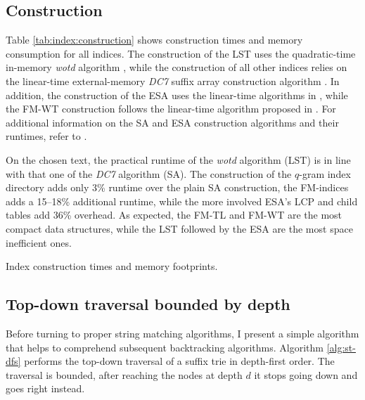 \subsection{Construction}
\label{sec:index:algo:construction}

Table \ref{tab:index:construction} shows construction times and memory consumption for all indices.
The construction of the LST uses the quadratic-time in-memory \emph{wotd} algorithm \citep{Giegerich1999}, while the construction of all other indices relies on the linear-time external-memory \emph{DC7} suffix array construction algorithm \citep{Dementiev2008}.
In addition, the construction of the ESA uses the linear-time algorithms in \citep{Kasai2001,Abouelhoda2004}, while the FM-WT construction follows the linear-time algorithm proposed in \citep{Grossi2003}.
For additional information on the SA and ESA construction algorithms and their runtimes, refer to \citep{Weese2013}.

On the chosen text, the practical runtime of the \emph{wotd} algorithm (LST) is in line with that one of the \emph{DC7} algorithm (SA). The construction of the $q$-gram index directory adds only 3\% runtime over the plain SA construction, the FM-indices adds a 15--18\% additional runtime, while the more involved ESA's LCP and child tables add 36\% overhead.
As expected, the FM-TL and FM-WT are the most compact data structures, while the LST followed by the ESA are the most space inefficient ones.

\begin{table}[t]
\begin{center}
\caption[Index construction times and memory footprints]{Index construction times and memory footprints.}
\sffamily

\label{tab:index:construction}
\end{center}
\end{table}

\subsection{Top-down traversal bounded by depth}
\label{sec:index:algo:traversal}

Before turning to proper string matching algorithms, I present a simple algorithm that helps to comprehend subsequent backtracking algorithms.
Algorithm \ref{alg:st-dfs} performs the top-down traversal of a suffix trie in depth-first order.
The traversal is bounded, \ie after reaching the nodes at depth $d$ it stops going down and goes right instead.

